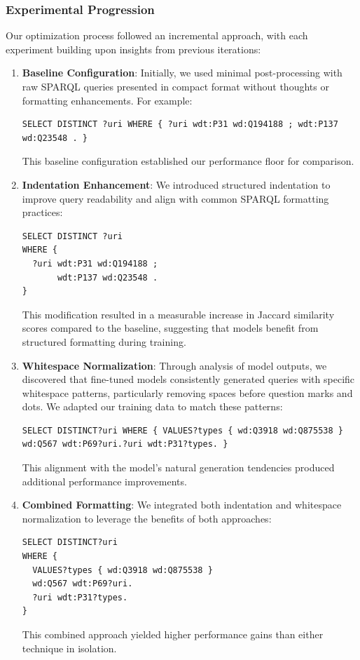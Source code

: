 \subsubsection{Experimental Progression}

Our optimization process followed an incremental approach, with each experiment building upon insights from previous iterations:

\begin{enumerate}
    \item \textbf{Baseline Configuration}: Initially, we used minimal post-processing with raw SPARQL queries presented in compact format without thoughts or formatting enhancements. For example:
    \begin{lstlisting}[language=SPARQL, caption=Baseline SPARQL format without post-processing]
SELECT DISTINCT ?uri WHERE { ?uri wdt:P31 wd:Q194188 ; wdt:P137 wd:Q23548 . }
\end{lstlisting}
    This baseline configuration established our performance floor for comparison.

    \item \textbf{Indentation Enhancement}: We introduced structured indentation to improve query readability and align with common SPARQL formatting practices:
    \begin{lstlisting}[language=SPARQL, caption=SPARQL with indentation formatting]
SELECT DISTINCT ?uri
WHERE {
  ?uri wdt:P31 wd:Q194188 ;
       wdt:P137 wd:Q23548 .
}
\end{lstlisting}
    This modification resulted in a measurable increase in Jaccard similarity scores compared to the baseline, suggesting that models benefit from structured formatting during training.

    \item \textbf{Whitespace Normalization}: Through analysis of model outputs, we discovered that fine-tuned models consistently generated queries with specific whitespace patterns, particularly removing spaces before question marks and dots. We adapted our training data to match these patterns:
    \begin{lstlisting}[language=SPARQL, caption=SPARQL with whitespace normalization]
SELECT DISTINCT?uri WHERE { VALUES?types { wd:Q3918 wd:Q875538 } wd:Q567 wdt:P69?uri.?uri wdt:P31?types. }
\end{lstlisting}
    This alignment with the model's natural generation tendencies produced additional performance improvements.

    \item \textbf{Combined Formatting}: We integrated both indentation and whitespace normalization to leverage the benefits of both approaches:
    \begin{lstlisting}[language=SPARQL, caption=SPARQL with combined formatting optimizations]
SELECT DISTINCT?uri
WHERE {
  VALUES?types { wd:Q3918 wd:Q875538 }
  wd:Q567 wdt:P69?uri.
  ?uri wdt:P31?types.
}
\end{lstlisting}
    This combined approach yielded higher performance gains than either technique in isolation.


\end{enumerate}
